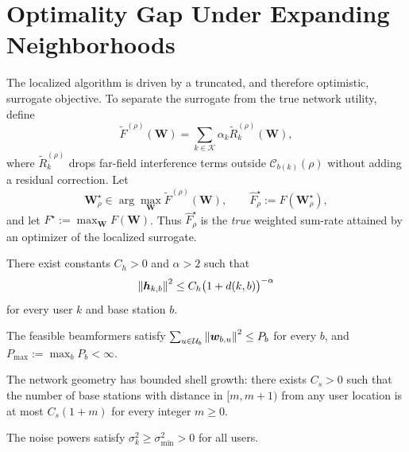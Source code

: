 \section{Optimality Gap Under Expanding Neighborhoods}

The localized algorithm is driven by a truncated, and therefore optimistic, surrogate objective. To separate the surrogate from the true network utility, define
\begin{equation}
\widetilde{F}^{(\rho)}(\mathbf{W}) = \sum_{k \in \mathcal{K}} \alpha_k \widetilde{R}_k^{(\rho)}(\mathbf{W}),
\end{equation}
where $\widetilde{R}_k^{(\rho)}$ drops far-field interference terms outside $\mathcal{C}_{b(k)}(\rho)$ without adding a residual correction. Let
\begin{equation}
\label{eq:localized_optimizer_def}
\mathbf{W}_{\rho}^{\star} \in \arg \max_{\mathbf{W}} \widetilde{F}^{(\rho)}(\mathbf{W}),
\qquad
\widehat{F}_{\rho}^{\star} := F(\mathbf{W}_{\rho}^{\star}),
\end{equation}
and let $F^{\star} := \max_{\mathbf{W}} F(\mathbf{W})$. Thus $\widehat{F}_{\rho}^{\star}$ is the \emph{true} weighted sum-rate attained by an optimizer of the localized surrogate.

\begin{assumption}
There exist constants $C_h > 0$ and $\alpha > 2$ such that
\begin{equation}
\left\lVert \boldsymbol{h}_{k,b} \right\rVert^2 \le C_h \bigl(1 + d(k,b)\bigr)^{-\alpha}
\end{equation}
for every user $k$ and base station $b$.
\end{assumption}

\begin{assumption}
The feasible beamformers satisfy $\sum_{u \in \mathcal{U}_b} \left\lVert \boldsymbol{w}_{b,u} \right\rVert^2 \le P_b$ for every $b$, and $P_{\max} := \max_b P_b < \infty$.
\end{assumption}

\begin{assumption}
The network geometry has bounded shell growth: there exists $C_s > 0$ such that the number of base stations with distance in $[m,m+1)$ from any user location is at most $C_s(1+m)$ for every integer $m \ge 0$.
\end{assumption}

\begin{assumption}
The noise powers satisfy $\sigma_k^2 \ge \sigma_{\min}^2 > 0$ for all users.
\end{assumption}

